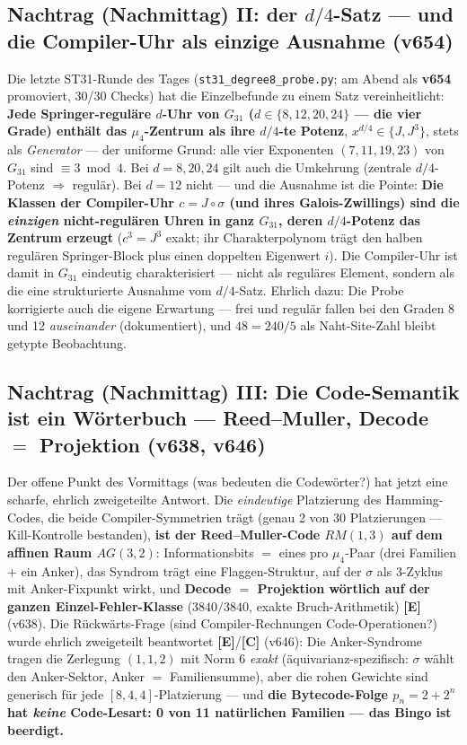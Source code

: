 \documentclass[11pt,a4paper]{article}
\newcommand{\E}{\textcolor{gut}{\textbf{[E]}}}
\newcommand{\C}{\textcolor{kern}{\textbf{[C]}}}
\begin{document}
\subsection*{Nachtrag (Nachmittag) II: der $d/4$-Satz --- und die
Compiler-Uhr als einzige Ausnahme (v654)}

Die letzte ST31-Runde des Tages (\texttt{st31\_degree8\_probe.py};
am Abend als \textbf{v654} promoviert, 30/30 Checks) hat die
Einzelbefunde zu einem Satz vereinheitlicht: \textbf{Jede Springer-reguläre $d$-Uhr von $G_{31}$
($d \in \{8, 12, 20, 24\}$ --- die vier Grade) enthält das
$\mu_4$-Zentrum als ihre $d/4$-te Potenz}, $x^{d/4} \in \{J, J^3\}$,
stets als \emph{Generator} --- der uniforme Grund: alle vier
Exponenten $(7, 11, 19, 23)$ von $G_{31}$ sind $\equiv 3 \bmod 4$.
Bei $d = 8, 20, 24$ gilt auch die Umkehrung (zentrale
$d/4$-Potenz $\Rightarrow$ regulär). Bei $d = 12$ nicht --- und die
Ausnahme ist die Pointe: \textbf{Die Klassen der Compiler-Uhr
$c = J \circ \sigma$ (und ihres Galois-Zwillings) sind die
\emph{einzigen} nicht-regulären Uhren in ganz $G_{31}$, deren
$d/4$-Potenz das Zentrum erzeugt} ($c^3 = J^3$ exakt; ihr
Charakterpolynom trägt den halben regulären Springer-Block plus
einen doppelten Eigenwert $i$). Die Compiler-Uhr ist damit in
$G_{31}$ eindeutig charakterisiert --- nicht als reguläres Element,
sondern als die eine strukturierte Ausnahme vom $d/4$-Satz.
Ehrlich dazu: Die Probe korrigierte auch die eigene Erwartung ---
\glqq{}frei\grqq{} und \glqq{}regulär\grqq{} fallen bei den Graden 8
und 12 \emph{auseinander} (dokumentiert), und $48 = 240/5$ als
Naht-Site-Zahl bleibt getypte Beobachtung.

\subsection*{Nachtrag (Nachmittag) III: Die Code-Semantik ist ein
Wörterbuch --- Reed--Muller, Decode $=$ Projektion (v638, v646)}

Der offene Punkt des Vormittags (\glqq{}was bedeuten die
Codewörter?\grqq{}) hat jetzt eine scharfe, ehrlich zweigeteilte
Antwort. Die \emph{eindeutige} Platzierung des Hamming-Codes, die
beide Compiler-Symmetrien trägt (genau 2 von 30 Platzierungen ---
Kill-Kontrolle bestanden), \textbf{ist der Reed--Muller-Code
$RM(1,3)$ auf dem affinen Raum $AG(3,2)$}: Informationsbits $=$ eines
pro $\mu_4$-Paar (drei Familien $+$ ein Anker), das Syndrom trägt
eine Flaggen-Struktur, auf der $\sigma$ als 3-Zyklus mit
Anker-Fixpunkt wirkt, und \textbf{Decode $=$ Projektion wörtlich auf
der ganzen Einzel-Fehler-Klasse} ($3840/3840$, exakte
Bruch-Arithmetik) \E{} (v638). Die Rückwärts-Frage (\glqq{}sind
Compiler-Rechnungen Code-Operationen?\grqq{}) wurde ehrlich zweigeteilt
beantwortet \E{}/\C{} (v646): Die Anker-Syndrome tragen die
Zerlegung $(1,1,2)$ mit Norm 6 \emph{exakt} (äquivarianz-spezifisch:
$\sigma$ wählt den Anker-Sektor, Anker $=$ Familiensumme), aber die
rohen Gewichte sind generisch für jede $[8,4,4]$-Platzierung ---
und \textbf{die Bytecode-Folge $p_n = 2 + 2^n$ hat \emph{keine}
Code-Lesart: 0 von 11 natürlichen Familien --- das Bingo ist
beerdigt.}
\end{document}
